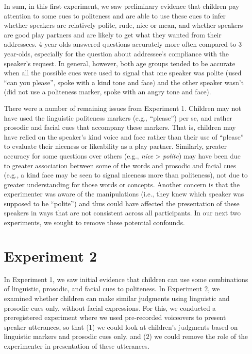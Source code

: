 \documentclass[oneside]{report}
\begin{document}
In sum, in this first experiment, we saw preliminary evidence that
children pay attention to some cues to politeness and are able to use
these cues to infer whether speakers are relatively polite, rude, nice
or mean, and whether speakers are good play partners and are likely to
get what they wanted from their addressees. 4-year-olds answered
questions accurately more often compared to 3-year-olds, especially for
the question about addressee's compliance with the speaker's request. In
general, however, both age groups tended to be accurate when all the
possible cues were used to signal that one speaker was polite (used
``can you please'', spoke with a kind tone and face) and the other
speaker wasn't (did not use a politeness marker, spoke with an angry
tone and face).

There were a number of remaining issues from Experiment 1. Children may
not have used the linguistic politeness markers (e.g., ``please'') per
se, and rather prosodic and facial cues that accompany these markers.
That is, children may have relied on the speaker's kind voice and face
rather than their use of ``please'' to evaluate their niceness or
likeability as a play partner. Similarly, greater accuracy for some
questions over others (e.g., \emph{nice} \textgreater{} \emph{polite})
may have been due to greater association between some of the words and
prosodic and facial cues (e.g., a kind face may be seen to signal
niceness more than politeness), not due to greater understanding for
those words or concepts. Another concern is that the experimenter was
aware of the manipulations (i.e., they knew which speaker was supposed
to be ``polite'') and thus could have affected the presentation of these
speakers in ways that are not consistent across all participants. In our
next two experiments, we sought to remove these potential confounds.

\section{Experiment 2}\label{experiment-2}

In Experiment 1, we saw initial evidence that children can use some
combinations of linguistic, prosodic, and facial cues to politeness. In
Experiment 2, we examined whether children can make similar judgments
using linguistic and prosodic cues only, without facial expressions. For
this, we conducted a preregistered experiment where we used pre-recorded
voiceovers to present speaker utterances, so that (1) we could look at
children's judgments based on linguistic markers and prosodic cues only,
and (2) we could remove the role of the experimenter in presentation of
these utterances.
\end{document}
